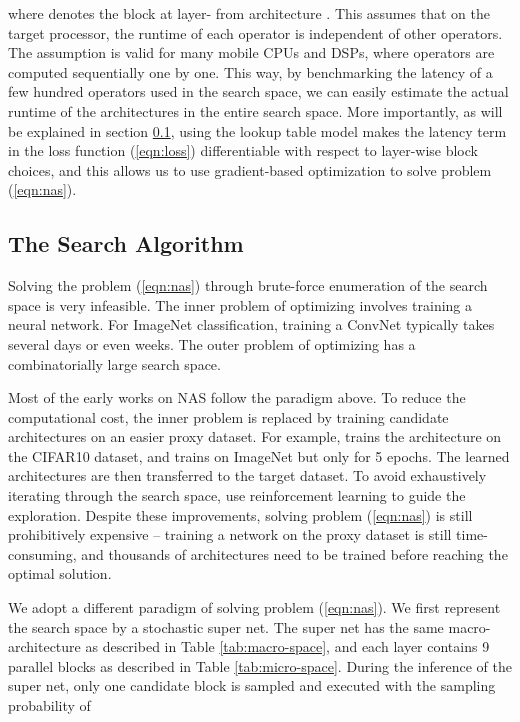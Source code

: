 \documentclass[10pt,twocolumn,letterpaper]{article}
\begin{document}
where  denotes the block at layer- from architecture . This assumes that on the target processor, the runtime of each operator is independent of other operators. The assumption is valid for many mobile CPUs and DSPs, where operators are computed sequentially one by one. This way, by benchmarking the latency of a few hundred operators used in the search space, we can easily estimate the actual runtime of the  architectures in the entire search space. More importantly, as will be explained in section \ref{sec:dnas}, using the lookup table model makes the latency term in the loss function (\ref{eqn:loss}) differentiable with respect to layer-wise block choices, and this allows us to use gradient-based optimization to solve problem (\ref{eqn:nas}). 

\subsection{The Search Algorithm}
\label{sec:dnas}
Solving the problem (\ref{eqn:nas}) through brute-force enumeration of the search space is very infeasible. The inner problem of optimizing  involves training a neural network. For ImageNet classification, training a ConvNet typically takes several days or even weeks. The outer problem of optimizing  has a combinatorially large search space. 

Most of the early works on NAS \cite{zoph2016neural, zoph2017learning, tan2018mnasnet} follow the paradigm above. To reduce the computational cost, the inner problem is replaced by training candidate architectures on an easier proxy dataset. For example, \cite{zoph2016neural, zoph2017learning} trains the architecture on the CIFAR10 dataset, and \cite{tan2018mnasnet} trains on ImageNet but only for 5 epochs. The learned architectures are then transferred to the target dataset. To avoid exhaustively iterating through the search space, \cite{zoph2016neural,zoph2017learning,tan2018mnasnet} use reinforcement learning to guide the exploration. Despite these improvements, solving problem (\ref{eqn:nas}) is still prohibitively expensive -- training a network on the proxy dataset is still time-consuming, and thousands of architectures need to be trained before reaching the optimal solution.

We adopt a different paradigm of solving problem (\ref{eqn:nas}). We first represent the search space by a stochastic super net. The super net has the same macro-architecture as described in Table \ref{tab:macro-space}, and each layer contains 9 parallel blocks as described in Table \ref{tab:micro-space}.  During the inference of the super net, only one candidate block is sampled and executed with the sampling probability of
\end{document}
